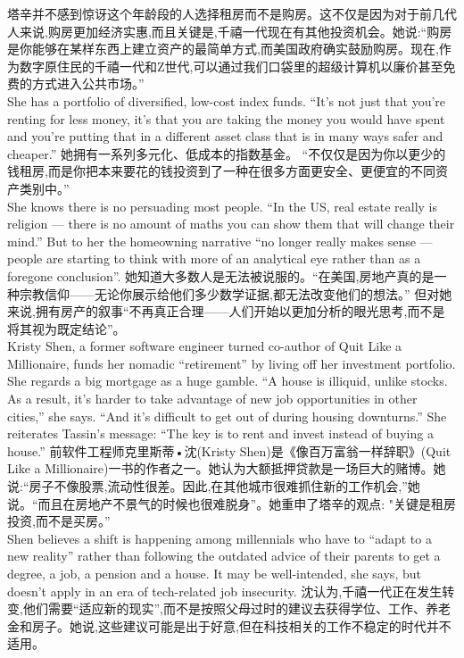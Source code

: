 \documentclass[a4paper,12pt]{article}
\begin{document}
塔辛并不感到惊讶这个年龄段的人选择租房而不是购房。这不仅是因为对于前几代人来说,购房更加经济实惠,而且关键是,千禧一代现在有其他投资机会。她说:“购房是你能够在某样东西上建立资产的最简单方式,而美国政府确实鼓励购房。现在,作为数字原住民的千禧一代和Z世代,可以通过我们口袋里的超级计算机以廉价甚至免费的方式进入公共市场。”
\\She has a portfolio of diversified, low-cost index funds. “It's not just that you're renting for less money, it's that you are taking the money you would have spent and you're putting that in a different asset class that is in many ways safer and cheaper.”
她拥有一系列多元化、低成本的指数基金。 “不仅仅是因为你以更少的钱租房,而是你把本来要花的钱投资到了一种在很多方面更安全、更便宜的不同资产类别中。”
\\She knows there is no persuading most people. “In the US, real estate really is religion — there is no amount of maths you can show them that will change their mind.” But to her the homeowning narrative “no longer really makes sense — people are starting to think with more of an analytical eye rather than as a foregone conclusion”.
她知道大多数人是无法被说服的。“在美国,房地产真的是一种宗教信仰——无论你展示给他们多少数学证据,都无法改变他们的想法。” 但对她来说,拥有房产的叙事“不再真正合理——人们开始以更加分析的眼光思考,而不是将其视为既定结论”。
\\Kristy Shen, a former software engineer turned co-author of Quit Like a Millionaire, funds her nomadic “retirement” by living off her investment portfolio. She regards a big mortgage as a huge gamble. “A house is illiquid, unlike stocks. As a result, it's harder to take advantage of new job opportunities in other cities,” she says. “And it's difficult to get out of during housing downturns.” She reiterates Tassin's message: “The key is to rent and invest instead of buying a house.”
前软件工程师克里斯蒂•沈(Kristy Shen)是《像百万富翁一样辞职》(Quit Like a Millionaire)一书的作者之一。她认为大额抵押贷款是一场巨大的赌博。她说:“房子不像股票,流动性很差。因此,在其他城市很难抓住新的工作机会,”她说。“而且在房地产不景气的时候也很难脱身”。她重申了塔辛的观点: "关键是租房投资,而不是买房。”
\\Shen believes a shift is happening among millennials who have to “adapt to a new reality” rather than following the outdated advice of their parents to get a degree, a job, a pension and a house. It may be well-intended, she says, but doesn't apply in an era of tech-related job insecurity.
沈认为,千禧一代正在发生转变,他们需要“适应新的现实”,而不是按照父母过时的建议去获得学位、工作、养老金和房子。她说,这些建议可能是出于好意,但在科技相关的工作不稳定的时代并不适用。
\end{document}
